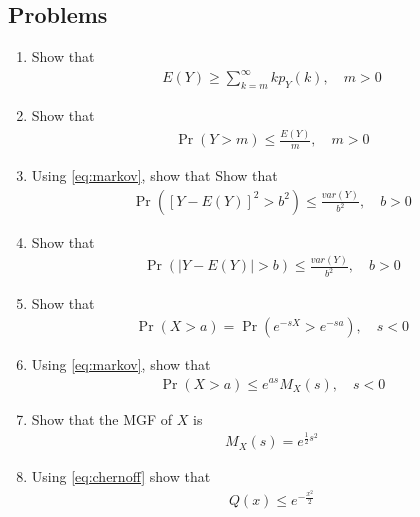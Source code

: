 \documentclass[journal,12pt,onecolumn]{IEEEtran}
\renewcommand\thesection{\arabic{section}}
\renewcommand\thesubsection{\thesection.\arabic{subsection}}
\providecommand{\pr}[1]{\ensuremath{\Pr\left(#1\right)}}
\providecommand{\sbrak}[1]{\ensuremath{{}\left[#1\right]}}
\providecommand{\brak}[1]{\ensuremath{\left(#1\right)}}
\theoremstyle{remark}
\providecommand{\abs}[1]{\left\vert#1\right\vert}
\numberwithin{equation}{section}
\begin{document}
\subsection{Problems}
\begin{enumerate}[label=\arabic*.,ref=\thesubsection.\theenumi]
\item Show that
\begin{align}
	E\brak{Y} \ge \sum_{k=m}^{\infty}kp_{Y}(k), \quad m > 0
\end{align}
\item Show that
\begin{align}
	\pr{Y>m} \le \frac{E\brak{Y}}{ m}, \quad  m > 0
	\label{eq:markov}
\end{align}
\item Using 
	\eqref{eq:markov}, show that 
Show that
\begin{align}
	\pr{\sbrak{Y-E\brak{Y}}^2>b^2} \le \frac{var(Y)}{b^2}, \quad b > 0
\end{align}
\item Show that 
\begin{align}
	\pr{\abs{Y-E\brak{Y}}>b} \le \frac{var(Y)}{b^2}, \quad b > 0
\end{align}
\item Show that 
\begin{align}
	\pr{X > a} = \pr{e^{-sX}> e^{-sa}}, \quad s < 0
\end{align}
\item Using 
	\eqref{eq:markov}, show that 
\begin{align}
	\label{eq:chernoff}
	\pr{X > a}\le e^{as}M_X(s), \quad s < 0
\end{align}
\item Show that the MGF of $X$ is 
\begin{align}
	M_X(s) = e^{\frac{1}{2}s^2}
\end{align}
\item Using 
	\eqref{eq:chernoff}
show that 
\begin{align}
	Q\brak{x} \le e^{-\frac{x^2}{2}}
\end{align}

 \end{enumerate}
%
\end{document}
